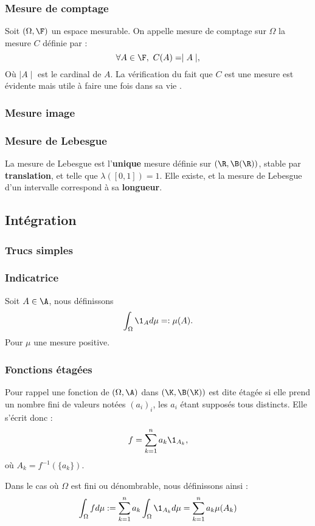 \subsubsection{Mesure de comptage}
Soit $(\Omega, \F)$ un espace mesurable. On appelle mesure de comptage sur $\Omega$ la mesure $C$ définie par : $$\forall A \in \F, ~ C(A) = \mid A\mid,$$
Où $\mid A\mid$ est le cardinal de $A$.
\bn
La vérification du fait que $C$ est une mesure est évidente mais utile à faire une fois dans sa vie .
\en

\subsubsection{Mesure image}
\ed

\subsubsection{Mesure de Lebesgue }
\bd
La mesure de Lebesgue est l'\textbf{unique} mesure définie sur $(\R, \B(\R))$, stable par \textbf{translation}, et telle que $\lambda([0,1]) = 1$. Elle existe, et la mesure de Lebesgue d'un intervalle correspond à sa \textbf{longueur}.
\ed
\bigskip

\subsection{Intégration}
\subsubsection{Trucs simples}
\subsubsection*{Indicatrice}
Soit $A \in \A$, nous définissons $$\int_{\Omega} \1_A d\mu =: \mu(A).$$ Pour $\mu$ une mesure positive.

\bigskip
\subsubsection*{Fonctions étagées}
Pour rappel une fonction de $(\Omega, \A)$ dans $(\K, \B(\K))$ est dite étagée si elle prend un nombre fini de valeurs notées $(a_i)_i$, les $a_i$ étant supposés tous distincts. Elle s'écrit donc : $$f = \sum_{k=1}^n a_k \1_{A_k},$$
où $A_k = f^{-1}(\{a_k\})$.
\bigskip

Dans le cas où $\Omega$ est fini ou dénombrable, nous définissons ainsi : 
$$\int_{\Omega} f d\mu := \sum_{k=1}^n a_k \int_{\Omega} \1_{A_k} d\mu = \sum_{k=1}^n a_k \mu(A_k)$$

